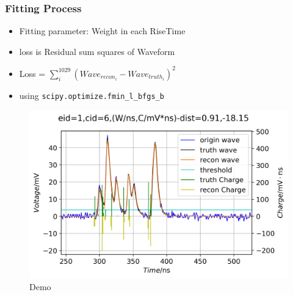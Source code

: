 \documentclass{beamer}
\begin{document}
\begin{frame}
\frametitle{Fitting Process}
\begin{itemize}
    \item Fitting parameter: Weight in each RiseTime
    \item loss is Residual sum squares of Waveform
    \item Loss = $\sum_{i}^{1029}(Wave_{recon_i}-Wave_{truth_i})^{2}$
    \item using \lstinline{scipy.optimize.fmin_l_bfgs_b}
\end{itemize}
\setlength{\belowcaptionskip}{0mm}
\begin{figure}
    \centering
    \caption{Demo}
    \includegraphics[width=0.7\linewidth]{img/demo.png}
\end{figure}
\end{frame}
\end{document}
